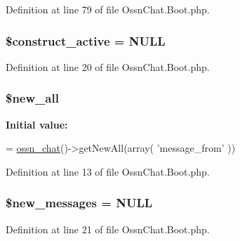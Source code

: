 Definition at line 79 of file Ossn\+Chat.\+Boot.\+php.

\subsubsection[{\texorpdfstring{\$construct\+\_\+active}{$construct_active}}]{\setlength{\rightskip}{0pt plus 5cm}\$construct\+\_\+active = N\+U\+LL}\hypertarget{_ossn_chat_8_boot_8php_a9612ca0b4b59a97699c0618974905194}{}\label{_ossn_chat_8_boot_8php_a9612ca0b4b59a97699c0618974905194}


Definition at line 20 of file Ossn\+Chat.\+Boot.\+php.

\subsubsection[{\texorpdfstring{\$new\+\_\+all}{$new_all}}]{\setlength{\rightskip}{0pt plus 5cm}\$new\+\_\+all}\hypertarget{_ossn_chat_8_boot_8php_a4bafc097f2212902dbd94a8ae24af73a}{}\label{_ossn_chat_8_boot_8php_a4bafc097f2212902dbd94a8ae24af73a}
{\bfseries Initial value\+:}
\begin{DoxyCode}
= \hyperlink{ossn_8lib_8chat_8php_adfe2d47e3e6a6825beb8e3b9c8d4c6dd}{ossn\_chat}()->getNewAll(array(
        \textcolor{stringliteral}{'message\_from'}
))
\end{DoxyCode}


Definition at line 13 of file Ossn\+Chat.\+Boot.\+php.

\subsubsection[{\texorpdfstring{\$new\+\_\+messages}{$new_messages}}]{\setlength{\rightskip}{0pt plus 5cm}\$new\+\_\+messages = N\+U\+LL}\hypertarget{_ossn_chat_8_boot_8php_a94aa1be9d7b9a51dd2d68f4829b73f92}{}\label{_ossn_chat_8_boot_8php_a94aa1be9d7b9a51dd2d68f4829b73f92}


Definition at line 21 of file Ossn\+Chat.\+Boot.\+php.

